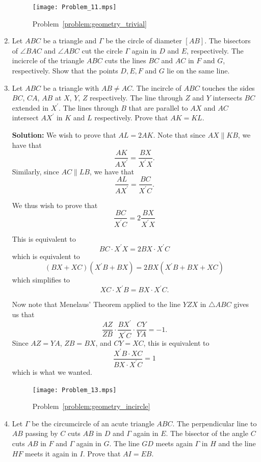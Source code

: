 \documentclass{article}
\newcommand{\solution}[1]{%
\ifsolutions%
    \textbf{Solution: } #1
\fi
}
\begin{document}
\begin{enumerate}
{\begin{figure}[!ht]
\centering
\caption{Problem~\ref{problem:geometry_trivial}}\label{fig:geometry_trivial}
\texttt{[image: Problem\_11.mps]}
\end{figure}
}

\item Let $ABC$ be a triangle and $\Gamma$ be the circle of diameter $[AB]$. The bisectors of $\angle BAC$ and $\angle ABC$ cut the circle $\Gamma$ again in $D$ and $E$, respectively. The incicrcle of the triangle $ABC$ cuts the lines $BC$ and $AC$ in $F$ and $G$, respectively. Show that the points $D, E, F$ and $G$ lie on the same line.

\item\label{problem:geometry_incircle} %
Let $ABC$ be a triangle with $AB \neq AC$. The incircle of $ABC$ touches the sides $BC$, $CA$, $AB$ at $X$, $Y$, $Z$ respectively. The line through $Z$ and $Y$ intersects $BC$ extended in $X^\prime$. The lines through $B$ that are parallel to $AX$ and $AC$ intersect $AX^\prime$ in $K$ and $L$ respectively. Prove that $AK = KL$.

\solution{%
We wish to prove that $AL = 2AK$. Note that since $AX \parallel KB$, we have that
\[
  \frac{AK}{AX^\prime} = \frac{BX}{X^\prime X}.
\]
Similarly, since $AC \parallel LB$, we have that
\[
  \frac{AL}{AX^\prime} = \frac{BC}{X^\prime C}.
\]

We thus wish to prove that
\[
  \frac{BC}{X^\prime C} = 2 \frac{BX}{X^\prime X}
\]

This is equivalent to
\[
  BC \cdot X^\prime X = 2 BX \cdot X^\prime C
\]
which is equivalent to
\[
  (BX + XC) (X^\prime B + BX) = 2 BX (X^\prime B + BX + XC)
\]
which simplifies to
\[
  XC \cdot X^\prime B = BX \cdot X^\prime C.
\]

Now note that Menelaus' Theorem applied to the line $YZX$ in $\triangle ABC$ gives us that
\[
  \frac{AZ}{ZB} \cdot \frac{BX^\prime}{X^\prime C} \cdot \frac{CY}{YA} = -1.
\]
Since $AZ = YA$, $ZB = BX$, and $CY = XC$, this is equivalent to
\[
  \frac{X^\prime B \cdot XC}{BX \cdot X^\prime C} = 1
\]
which is what we wanted.

\begin{figure}[!ht]
\centering
\caption{Problem~\ref{problem:geometry_incircle}}\label{fig:geometry_incircle}
\texttt{[image: Problem\_13.mps]}
\end{figure}
}

\item Let $\Gamma$ be the circumcircle of an acute triangle $ABC$. The perpendicular line to $AB$ passing by $C$ cuts $AB$ in $D$ and $\Gamma$ again in $E$. The bisector of the angle $C$ cuts $AB$ in $F$ and $\Gamma$ again in $G$. The line $GD$ meets again $\Gamma$ in $H$ and the line $HF$ meets it again in $I$. Prove that $AI = EB$.


\end{enumerate}
\end{document}
